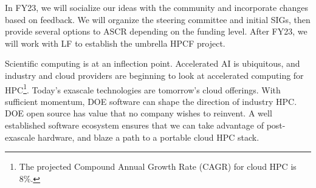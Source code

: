 \documentclass[11pt]{article}
\begin{document}
In FY23, we will socialize our ideas with the community and incorporate changes based on
feedback. We will organize the steering committee and initial SIGs, then provide several
options to ASCR depending on the funding level. After FY23, we will work with LF to
establish the umbrella HPCF project.

Scientific computing is at an inflection point. Accelerated AI is ubiquitous, and
industry and cloud providers are beginning to look at accelerated computing for
HPC\footnote{The projected Compound Annual Growth Rate (CAGR) for cloud HPC is 8\%.}.
Today's exascale technologies are tomorrow's cloud offerings.
%
With sufficient momentum, DOE software can shape the direction of industry HPC.
DOE open source has value that no company wishes to reinvent. A well established
software ecosystem ensures that we can take advantage of post-exascale hardware, and
blaze a path to a portable cloud HPC stack.




%
%  




%

%
\end{document}
